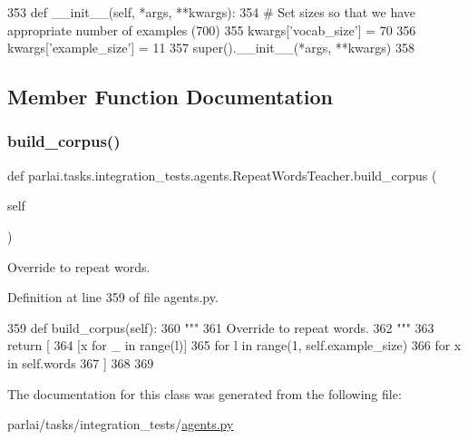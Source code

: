 \begin{DoxyCode}
353     \textcolor{keyword}{def }\_\_init\_\_(self, *args, **kwargs):
354         \textcolor{comment}{# Set sizes so that we have appropriate number of examples (700)}
355         kwargs[\textcolor{stringliteral}{'vocab\_size'}] = 70
356         kwargs[\textcolor{stringliteral}{'example\_size'}] = 11
357         super().\_\_init\_\_(*args, **kwargs)
358 
\end{DoxyCode}


\subsection{Member Function Documentation}
\mbox{\label{classparlai_1_1tasks_1_1integration__tests_1_1agents_1_1RepeatWordsTeacher_ad03d8fb602aca6baf0b62f633b3bb54c}} 
\subsubsection{\texorpdfstring{build\+\_\+corpus()}{build\_corpus()}}
{\footnotesize\ttfamily def parlai.\+tasks.\+integration\+\_\+tests.\+agents.\+Repeat\+Words\+Teacher.\+build\+\_\+corpus (\begin{DoxyParamCaption}\item[{}]{self }\end{DoxyParamCaption})}

\begin{DoxyVerb}Override to repeat words.
\end{DoxyVerb}
 

Definition at line 359 of file agents.\+py.


\begin{DoxyCode}
359     \textcolor{keyword}{def }build\_corpus(self):
360         \textcolor{stringliteral}{"""}
361 \textcolor{stringliteral}{        Override to repeat words.}
362 \textcolor{stringliteral}{        """}
363         \textcolor{keywordflow}{return} [
364             [x \textcolor{keywordflow}{for} \_ \textcolor{keywordflow}{in} range(l)]
365             \textcolor{keywordflow}{for} l \textcolor{keywordflow}{in} range(1, self.example\_size)
366             \textcolor{keywordflow}{for} x \textcolor{keywordflow}{in} self.words
367         ]
368 
369 
\end{DoxyCode}


The documentation for this class was generated from the following file\+:\begin{DoxyCompactItemize}
\item 
parlai/tasks/integration\+\_\+tests/\hyperlink{parlai_2tasks_2integration__tests_2agents_8py}{agents.\+py}\end{DoxyCompactItemize}
